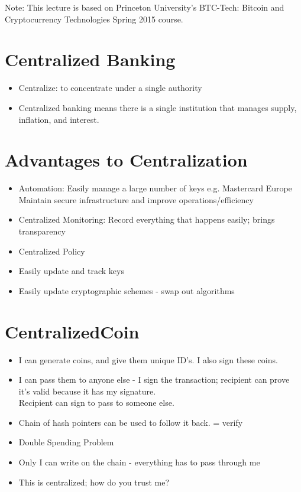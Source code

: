\documentclass{article}
\begin{document}
\maketitle

Note: This lecture is based on Princeton University's BTC-Tech: Bitcoin and Cryptocurrency Technologies Spring 2015 course.


\section*{Centralized Banking}
\begin{itemize}
  \item Centralize: to concentrate under a single authority
  \item Centralized banking means there is a single institution that manages supply, inflation, and interest.
\end{itemize}
\section*{Advantages to Centralization}
\begin{itemize}
  \item Automation:
    \subitem Easily manage a large number of keys e.g. Mastercard Europe
    \subitem Maintain secure infrastructure and improve operations/efficiency
  \item Centralized Monitoring:
    \subitem Record everything that happens easily; brings transparency
  \item Centralized Policy
  \item Easily update and track keys
  \item Easily update cryptographic schemes - swap out algorithms
\end{itemize}

\section*{CentralizedCoin}
\begin{itemize}
  \item I can generate coins, and give them unique ID's. I also sign these coins.
  \item I can pass them to anyone else - I sign the transaction; recipient can prove it's valid because it has my signature.\\
    Recipient can sign to pass to someone else. 
  \item Chain of hash pointers can be used to follow it back. = verify
  \item Double Spending Problem
  \item Only I can write on the chain - everything has to pass through me
  \item This is centralized; how do you trust me? 
\end{itemize}
\end{document}
